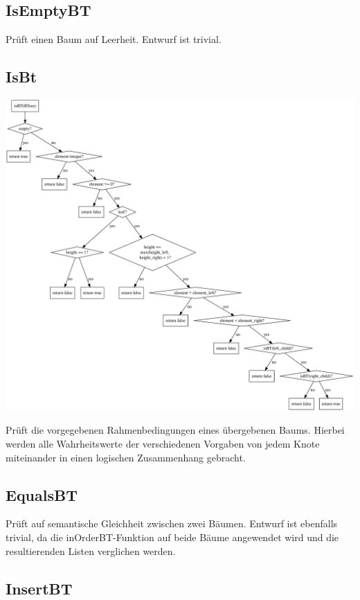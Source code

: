 \documentclass[11pt]{article}
\begin{document}
    \subsection{IsEmptyBT}
    Prüft einen Baum auf Leerheit. Entwurf ist trivial.

    \subsection{IsBt}

    \begin{center}
        \includegraphics[width=1.2\columnwidth] {isBt}
    \end{center}

    Prüft die vorgegebenen Rahmenbedingungen eines übergebenen
    Baums. Hierbei werden alle Wahrheitswerte der verschiedenen
    Vorgaben von jedem Knote miteinander in einen logischen
    Zusammenhang gebracht.

    \subsection{EqualsBT}
    Prüft auf semantische Gleichheit zwischen zwei Bäumen.
    Entwurf ist ebenfalls trivial, da die inOrderBT-Funktion
    auf beide Bäume angewendet wird und die resultierenden Listen verglichen werden.

    \subsection{InsertBT}
\end{document}

